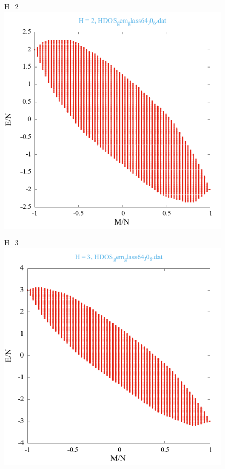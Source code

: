 \documentclass[utf8, babel, sor, jor, amsmath, amssymb, reprint]{elsarticle} %
\begin{document}
\begin{figure}[H]
\begin{minipage}[h]{0.45\linewidth}
	\end{minipage}
	\vfill
	\begin{minipage}[h]{0.45\linewidth}
		\centering H=2
		\includegraphics[width=1\linewidth]{HDOS_gem_glass64_J0_6.dat_H2.png}
	\end{minipage}
	\hfill
	\begin{minipage}[h]{0.45\linewidth}
		\centering H=3
		\includegraphics[width=1\linewidth]{HDOS_gem_glass64_J0_6.dat_H3.png}

\end{minipage}
\end{figure}
\end{document}
